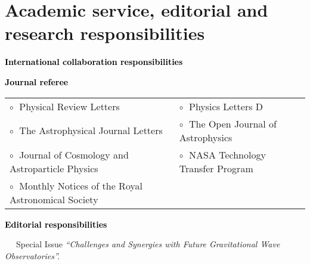 \vspace{-0.1cm} 

\vspace{-0.1cm}

\vspace{-0.1cm}

\vspace{0.2cm}

\section{Academic service, editorial and research responsibilities}

\textbf{\textcolor{black}{International collaboration responsibilities}}
\vspace{0.1cm}



\textbf{\textcolor{black}{Journal referee}}
\vspace{0.1cm}

\begin{tabular}{@{\hskip 0.4cm}l@{\hskip 0.4in}l}
$\circ\;$ Physical Review Letters & $\circ\;$ Physics Letters D \\
$\circ\;$  The Astrophysical Journal Letters  &  $\circ\;$  The Open Journal of Astrophysics  \\
$\circ\;$  Journal of Cosmology and Astroparticle Physics & $\circ\;$ NASA Technology Transfer Program \\
$\circ\;$  Monthly Notices of the Royal Astronomical Society& \\
\end{tabular}

\vspace{0.2cm}
\textbf{\textcolor{black}{Editorial responsibilities}}
\vspace{0.1cm}

\vspace{-0.1cm}
\hspace{0.4cm}$\phantom{\circ}\;$ Special Issue \textit{``Challenges and Synergies with Future Gravitational Wave Observatories''.}\vspace{0.1cm}

